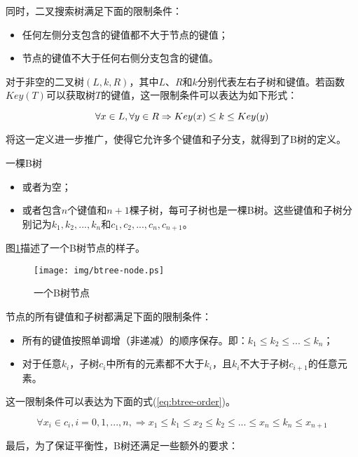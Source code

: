 \documentclass[UTF8]{article}
\begin{document}
同时，二叉搜索树满足下面的限制条件：
\begin{itemize}
\item 任何左侧分支包含的键值都不大于节点的键值；
\item 节点的键值不大于任何右侧分支包含的键值。
\end{itemize}

对于非空的二叉树$(L, k, R)$，其中$L$、$R$和$k$分别代表左右子树和键值。若函数$Key(T)$可以获取树$T$的键值，这一限制条件可以表达为如下形式：

\begin{equation}
\forall x \in L, \forall y \in R \\
\Rightarrow Key(x) \leq k \leq Key(y)
\end{equation}

将这一定义进一步推广，使得它允许多个键值和子分支，就得到了B树的定义。

一棵B树
\begin{itemize}
\item 或者为空；
\item 或者包含$n$个键值和$n+1$棵子树，每可子树也是一棵B树。这些键值和子树分别记为$k_1, k_2, ..., k_n$和$c_1, c_2, ..., c_n, c_{n+1}$。
\end{itemize}

图\ref{fig:btree-node}描述了一个B树节点的样子。

\begin{figure}[htbp]
  \centering
	\texttt{[image: img/btree-node.ps]}
  \caption{一个B树节点} \label{fig:btree-node}
\end{figure}

节点的所有键值和子树都满足下面的限制条件：

\begin{itemize}
\item 所有的键值按照单调增（非递减）的顺序保存。即：$k_1 \leq k_2 \leq ... \leq k_n$；
\item 对于任意$k_i$，子树$c_i$中所有的元素都不大于$k_i$，且$k_i$不大于子树$c_{i+1}$的任意元素。
\end{itemize}

这一限制条件可以表达为下面的式(\ref{eq:btree-order})。

\begin{equation}
\forall x_i \in c_i, i=0, 1, ..., n, \Rightarrow x_1 \leq k_1 \leq
x_2 \leq k_2 \leq ... \leq x_n \leq k_n \leq x_{n+1}
\label{eq:btree-order}
\end{equation}

最后，为了保证平衡性，B树还满足一些额外的要求：
\end{document}
